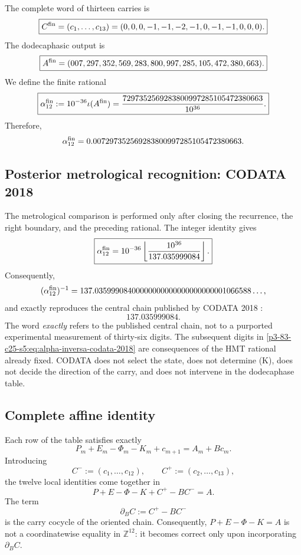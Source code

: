 The complete word of thirteen carries is
\[
 \boxed{
 C^{\rm fin}
 =(c_1,\ldots,c_{13})
 =(0,0,0,-1,-1,-2,-1,0,-1,-1,0,0,0).}
\]
The dodecaphasic output is
\[
 \boxed{
 A^{\rm fin}
 =(007,297,352,569,283,800,997,285,105,472,380,663).}
\]
We define the finite rational
\begin{equation}
 \boxed{
 \alpha_{12}^{\rm fin}
 :=10^{-36}\iota(A^{\rm fin})
 =\frac{7297352569283800997285105472380663}{10^{36}}.}
 \label{p3-83-c25-s5:eq:alpha-finita-autonoma}
\end{equation}
Therefore,
\[
 \alpha_{12}^{\rm fin}
 =0.007297352569283800997285105472380663.
\]

\subsection{Posterior metrological recognition: CODATA 2018}

The metrological comparison is performed only after closing the recurrence,
the right boundary, and the preceding rational. The integer identity gives
\begin{equation}
 \boxed{
 \alpha_{12}^{\rm fin}
 =10^{-36}
 \left\lfloor\frac{10^{36}}{137.035999084}\right\rfloor.}
 \label{p3-83-c25-s5:eq:alpha-finita-codata-2018}
\end{equation}
Consequently,
\begin{equation}
 (\alpha_{12}^{\rm fin})^{-1}
 =137.03599908400000000000000000000001066588\ldots,
 \label{p3-83-c25-s5:eq:alpha-inversa-codata-2018}
\end{equation}
and exactly reproduces the central chain published by CODATA 2018
\cite{Tiesinga2021CODATA}:
\[
 \boxed{137.035999084.}
\]
The word \emph{exactly} refers to the published central chain, not to a purported experimental measurement of thirty-six digits. The subsequent digits in \eqref{p3-83-c25-s5:eq:alpha-inversa-codata-2018} are consequences of the HMT rational already fixed. CODATA does not select the state, does not determine (K), does not decide the direction of the carry, and does not intervene in the dodecaphase table.

\subsection{Complete affine identity}

Each row of the table satisfies exactly
\begin{equation}
 P_m+E_m-\Phi_m-K_m+c_{m+1}
 =A_m+Bc_m.
 \label{p3-83-c25-s5:eq:identidad-local-acarreo-alpha}
\end{equation}
Introducing
\[
 C^-:=(c_1,\ldots,c_{12}),
 \qquad
 C^+:=(c_2,\ldots,c_{13}),
\]
the twelve local identities come together in
\begin{equation}
 \boxed{
 P+E-\Phi-K+C^+-BC^-=A.}
 \label{p3-83-c25-s5:eq:identidad-afin-vectorial-alpha}
\end{equation}
The term
\[
 \partial_BC:=C^+-BC^-
\]
is the carry cocycle of the oriented chain. Consequently,
\(P+E-\Phi-K=A\) is not a coordinatewise equality in
\(\mathbb Z^{12}\): it becomes correct only upon incorporating
\(\partial_BC\).


